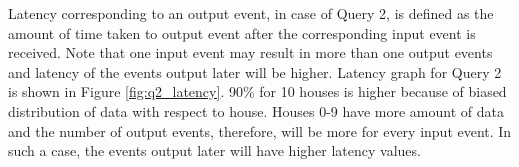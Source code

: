 \vspace*{-0.4cm}
Latency corresponding to an output event, in case of Query 2, is defined as the amount of time taken to output event after the corresponding input event is received.
Note that one input event may result in more than one output events and latency of the events output later will be higher.
Latency graph for Query 2 is shown in Figure \ref{fig:q2_latency}.
90\% for 10 houses is higher because of biased distribution of data with respect to house.
Houses 0-9 have more amount of data and the number of output events, therefore, will be more for every input event.
In such a case, the events output later will have higher latency values.
